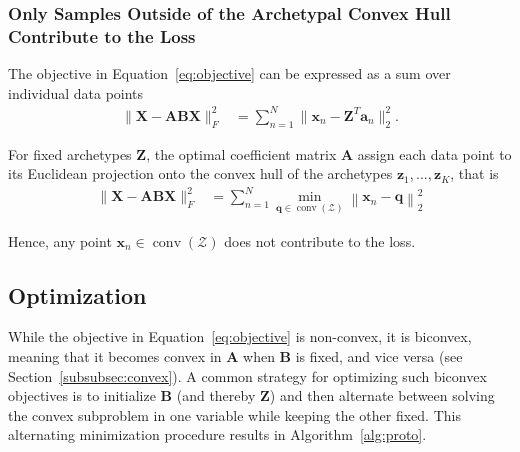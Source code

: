 \documentclass{article}
\begin{document}
\subsubsection{Only Samples Outside of the Archetypal Convex Hull Contribute to the Loss}
\label{subsubsec:alternative_aa_formulation}

The objective in Equation~\ref{eq:objective} can be expressed as a sum over individual data points
\begin{equation}
    \begin{aligned}
    \| \mathbf{X} - \mathbf{A} \mathbf{B} \mathbf{X} \|_F^2
    &= \sum_{n=1}^N \| \mathbf{x}_n - \mathbf{Z}^T \mathbf{a}_n \|_2^2.
    \end{aligned}
\end{equation}

For fixed archetypes $\mathbf{Z}$, the optimal coefficient matrix $\mathbf{A}$ assign each data point to its Euclidean projection onto the convex hull of the archetypes $\mathbf{z}_1, ..., \mathbf{z}_K$, that is
\begin{equation}
    \begin{aligned}
    \| \mathbf{X} - \mathbf{A} \mathbf{B} \mathbf{X} \|_F^2
    &= \sum_{n=1}^N \min_{\mathbf{q} \in \operatorname{conv}(\mathcal{Z})} \left\| \mathbf{x}_n - \mathbf{q} \right\|_2^2
    \end{aligned}
\end{equation}

Hence, any point $\mathbf{x}_n \in \operatorname{conv}(\mathcal{Z})$ does not contribute to the loss.

\subsection{Optimization}

While the objective in Equation~\ref{eq:objective} is non-convex, it is biconvex, meaning that it becomes convex in $\mathbf{A}$ when $\mathbf{B}$ is fixed, and vice versa (see Section~\ref{subsubsec:convex}). A common strategy for optimizing such biconvex objectives is to initialize $\mathbf{B}$ (and thereby $\mathbf{Z}$) and then alternate between solving the convex subproblem in one variable while keeping the other fixed. This alternating minimization procedure results in Algorithm~\ref{alg:proto}.
\end{document}

